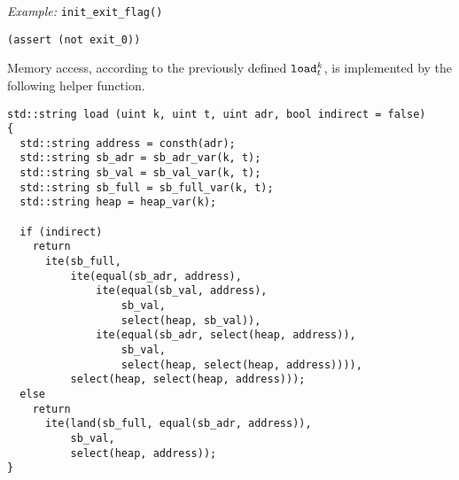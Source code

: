 \noindent
\emph{Example:} \lstinline[style=c++]{init_exit_flag()}

\begin{lstlisting}[language=SMTLib]
(assert (not exit_0))
\end{lstlisting}



\noindent
Memory access, according to the previously defined $\texttt{load}^k_t$, is implemented by the following helper function.

\begin{lstlisting}[style=c++]
std::string load (uint k, uint t, uint adr, bool indirect = false)
{
  std::string address = consth(adr);
  std::string sb_adr = sb_adr_var(k, t);
  std::string sb_val = sb_val_var(k, t);
  std::string sb_full = sb_full_var(k, t);
  std::string heap = heap_var(k);

  if (indirect)
    return
      ite(sb_full,
          ite(equal(sb_adr, address),
              ite(equal(sb_val, address),
                  sb_val,
                  select(heap, sb_val)),
              ite(equal(sb_adr, select(heap, address)),
                  sb_val,
                  select(heap, select(heap, address)))),
          select(heap, select(heap, address)));
  else
    return
      ite(land(sb_full, equal(sb_adr, address)),
          sb_val,
          select(heap, address));
}
\end{lstlisting}

